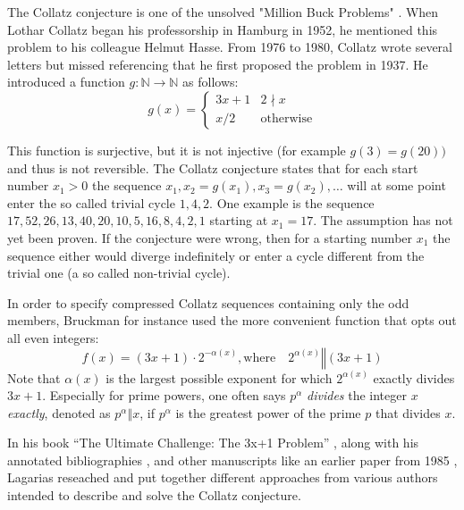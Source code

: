 \par\medskip
The Collatz conjecture is one of the unsolved "Million Buck Problems" \cite{Ref_Williams_2000}. When Lothar Collatz began his professorship in Hamburg in 1952, he mentioned this problem to his colleague Helmut Hasse. From 1976 to 1980, Collatz wrote several letters but missed referencing that he first proposed the problem in 1937. He introduced a function $g:\mathbb{N}\rightarrow\mathbb{N}$ as follows:
\begin{equation}
\label{eq:func_collatz}
g(x)=
\begin{cases}
3x+1	&	2\nmid x\\
x/2		&	\text{otherwise}
\end{cases}
\end{equation}

This function is surjective, but it is not injective (for example $g(3)=g(20))$ and thus is not reversible. The Collatz conjecture states that for each start number $x_1>0$ the sequence $x_1,x_2=g(x_1),x_3=g(x_2),\ldots$ will at some point enter the so called trivial cycle $1,4,2$. One example is the sequence $17,52,26,13,40,20,10,5,16,8,4,2,1$ starting at $x_1=17$. The assumption has not yet been proven. If the conjecture were wrong, then for a starting number $x_1$ the sequence either would diverge indefinitely or enter a cycle different from the trivial one (a so called non-trivial cycle).

In order to specify compressed Collatz sequences containing only the odd members, Bruckman \cite{Ref_Bruckman_2008} for instance used the more convenient function that opts out all even integers:
\begin{equation}
\label{eq:func_collatz_odd}
f(x)=(3x+1)\cdot2^{-\alpha(x)},\text{where}\hspace{1em}2^{\alpha(x)}\mathrel\Vert(3x+1)
\end{equation}
Note that $\alpha(x)$ is the largest possible exponent for which $2^{\alpha(x)}$ exactly divides $3x+1$. Especially for prime powers, one often says $p^\alpha$ \textit{divides} the integer $x$ \textit{exactly}, denoted as $p^\alpha\mathrel\Vert x$, if $p^\alpha$ is the greatest power of the prime $p$ that divides $x$.

\par\medskip
In his book “The Ultimate Challenge: The 3x+1 Problem” \cite{Ref_Lagarias_2010}, along with his annotated bibliographies \cite{Ref_Lagarias_2011}, \cite{Ref_Lagarias_2012} and other manuscripts like an earlier paper from 1985 \cite{Ref_Lagarias_1985}, Lagarias reseached and put together different approaches from various authors intended to describe and solve the Collatz conjecture.

